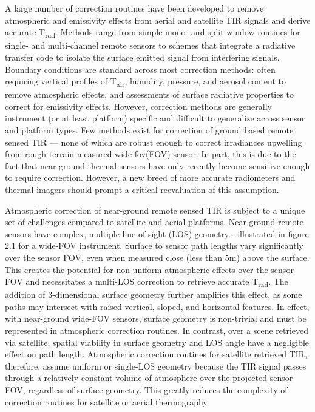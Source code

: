 A large number of correction routines have been developed to remove atmospheric and emissivity effects from aerial and satellite TIR signals and derive accurate T\textsubscript{rad}. Methods range from simple mono- \cite{Qin2001} and split-window \cite{Wan1996} routines for single- and multi-channel remote sensors to schemes that integrate a radiative transfer code to isolate the surface emitted signal from interfering signals. Boundary conditions are standard across most correction methods: often requiring vertical profiles of T\textsubscript{air}, humidity, pressure, and aerosol content to remove atmospheric effects, and assessments of surface radiative properties to correct for emissivity effects. However, correction methods are generally instrument (or at least platform) specific and difficult to generalize across sensor and platform types. Few methods exist for correction of ground based remote sensed TIR --- none of which are robust enough to correct irradiances upwelling from rough terrain measured  wide-\gls{fov}(FOV) sensor. In part, this is due to the fact that near ground thermal sensors have only recently become sensitive enough to require correction. However, a new breed of more accurate radiometers and thermal imagers should prompt a critical reevaluation of this assumption.

Atmospheric correction of near-ground remote sensed TIR is subject to a unique set of challenges compared to satellite and aerial platforms. Near-ground remote sensors have complex, multiple line-of-sight (LOS) geometry - illustrated in figure 2.1 for a wide-FOV instrument. Surface to sensor path lengths vary significantly over the sensor FOV, even when measured close (less than 5m) above the surface. This creates the potential for non-uniform atmospheric effects over the sensor FOV and necessitates a multi-LOS correction to retrieve accurate T\textsubscript{rad}. The addition of 3-dimensional surface geometry further amplifies this effect, as some paths may intersect with raised vertical, sloped, and horizontal features. In effect, with near-ground wide-FOV sensors, surface geometry is non-trivial and must be represented in atmospheric correction routines. In contrast, over a scene retrieved via satellite, spatial viability in surface geometry and LOS angle have a negligible effect on path length. Atmospheric correction routines for satellite retrieved TIR, therefore, assume uniform or single-LOS geometry because the TIR signal passes through a relatively constant volume of atmosphere over the projected sensor FOV, regardless of surface geometry. This greatly reduces the complexity of correction routines for satellite or aerial thermography. 

